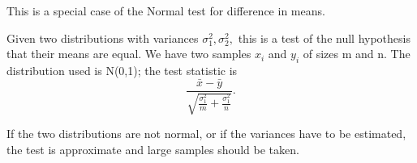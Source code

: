  This is a special case of the Normal test for difference in means.
\par
Given two distributions with variances $ \sigma _1 ^2 , \sigma _2 ^2 , $
this is a test of the null hypothesis that their means are equal.
We have two samples $x_{i}$  and $y_{i}$  of sizes m and n. The distribution used is N(0,1); the
test statistic is \[ \frac{ \bar{x} - \bar{y} }
{ \sqrt {\frac{\sigma _1 ^2 }{m} + \frac{\sigma _1 ^2}{n} } } . \]
\par
If the two distributions are not normal, or if the
variances have to be estimated, the test is approximate and
large samples should be taken.

